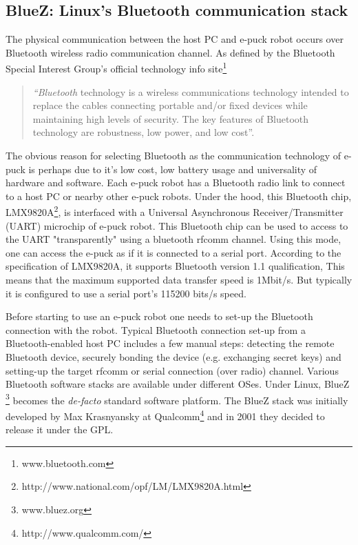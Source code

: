 \subsection{BlueZ: Linux's Bluetooth communication stack}
\label{expt-tools:bluez}
The physical communication between the host PC and e-puck robot occurs over Bluetooth wireless radio communication channel.  As defined by the Bluetooth Special Interest Group's official technology  info site\footnote{www.bluetooth.com}
 \begin{quote}
 \ssp
{\em ``Bluetooth} technology is a wireless communications technology intended to replace the cables connecting portable and/or fixed devices while maintaining high levels of security. The key features of Bluetooth technology are robustness, low power, and low cost''.
\end{quote}
\sdp
The obvious reason for selecting Bluetooth as the communication technology of e-puck is perhaps   due to it's low cost, low battery usage and universality of hardware and software. Each e-puck robot has a Bluetooth radio link to connect to a host PC or nearby other e-puck robots. Under the hood,  this Bluetooth  chip, LMX9820A\footnote{http://www.national.com/opf/LM/LMX9820A.html},   is  interfaced with a Universal Asynchronous Receiver/Transmitter (UART)  microchip of e-puck robot. This Bluetooth chip can be used to access to the UART "transparently" using a bluetooth rfcomm channel. Using this mode, one can access the e-puck as if it is connected to a serial port.  According to the specification of LMX9820A, it supports Bluetooth version 1.1 qualification, This means that the maximum supported data transfer speed is 1Mbit/s. But typically it is configured to use a serial port's 115200 bits/s speed.

Before starting to use an e-puck robot  one needs to set-up the Bluetooth connection with the robot. Typical Bluetooth connection set-up from a Bluetooth-enabled host PC includes a few manual steps:  detecting the remote Bluetooth device, securely bonding the device (e.g.  exchanging secret keys) and setting-up the target rfcomm or serial connection (over radio) channel. Various Bluetooth software stacks are available under different OSes. Under Linux, BlueZ \footnote{www.bluez.org} becomes the {\em de-facto} standard software platform. The BlueZ stack was initially developed by Max Krasnyansky at Qualcomm\footnote{http://www.qualcomm.com/} and in 2001  they decided to release it under the GPL.

